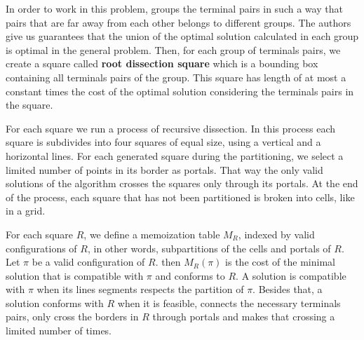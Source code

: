 
In order to work in this problem, \cite{LINTZMAYER2020134} groups the terminal pairs in such a way that pairs that are far away from each other belongs to different groups. The authors give us guarantees that the union of the optimal solution calculated in each group is optimal in the general problem. Then, for each group of terminals pairs, we create a square called \textbf{root dissection square} which is a bounding box containing all terminals pairs of the group. This square has length of at most a constant times the cost of the optimal solution considering the terminals pairs in the square.


For each square we run a process of recursive dissection. In this process each square is subdivides into four squares of equal size, using a vertical and a horizontal lines. For each generated square during the partitioning, we select a limited number of points in its border as portals. That way the only valid solutions of the algorithm crosses the squares only through its portals. At the end of the process, each square that has not been partitioned is broken into cells, like in a grid. 


For each square \(R\), we define a memoization table \(M_R\), indexed by valid configurations of \(R\), in other words, subpartitions of the cells and portals of \(R\). Let \(\pi\) be a valid configuration of \(R\). then \(M_R(\pi)\) is the cost of the minimal solution that is compatible with \(\pi\) and conforms to \(R\). A solution is compatible with \(\pi\) when its lines segments respects the partition of \(\pi\). Besides that, a solution conforms with \(R\) when it is feasible, connects the necessary terminals pairs, only cross the borders in \(R\) through portals and makes that crossing a limited number of times.

